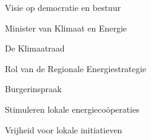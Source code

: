 
\begin{visie-concept}{Visie op democratie en bestuur}\end{visie-concept}

\begin{voorstel-concept}{Minister van Klimaat en Energie}\end{voorstel-concept}
\begin{voorstel-concept}{De Klimaatraad}\end{voorstel-concept}
\begin{voorstel-concept}{Rol van de Regionale Energiestrategie}\end{voorstel-concept}
\begin{voorstel-concept}{Burgerinspraak}\end{voorstel-concept}
\begin{voorstel-concept}{Stimuleren lokale energiecoöperaties}\end{voorstel-concept}
\begin{voorstel-concept}{Vrijheid voor lokale initiatieven}\end{voorstel-concept}
